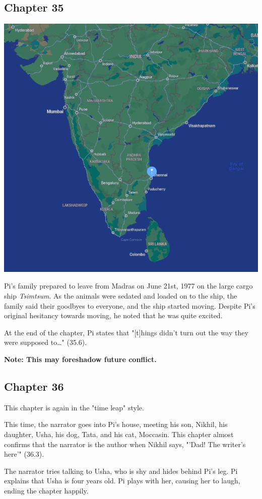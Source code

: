 \documentclass[11pt]{article}
\begin{document}
\subsection{Chapter 35}
\label{sec:orga2b8294}
\begin{center}
\includegraphics[width=.9\linewidth]{./img/madras.png}
\end{center}
Pi's family prepared to leave from Madras on June 21st, 1977 on the large cargo ship \emph{Tsimtsum}. As the animals were sedated and loaded on to the ship, the family said their goodbyes to everyone, and the ship started moving. Despite Pi's original hesitancy towards moving, he noted that he was quite excited.

At the end of the chapter, Pi states that "[t]hings didn't turn out the way they were supposed to\ldots{}" (35.6).

\textbf{Note: This may foreshadow future conflict.}
\subsection{Chapter 36}
\label{sec:org402acff}
This chapter is again in the "time leap" style.

This time, the narrator goes into Pi's house, meeting his son, Nikhil, his daughter, Usha, his dog, Tata, and his cat, Moccasin. This chapter almost confirms that the narrator is the author when Nikhil says, "'Dad! The writer's here'" (36.3).

The narrator tries talking to Usha, who is shy and hides behind Pi's leg. Pi explains that Usha is four years old. Pi plays with her, causing her to laugh, ending the chapter happily.
\end{document}
